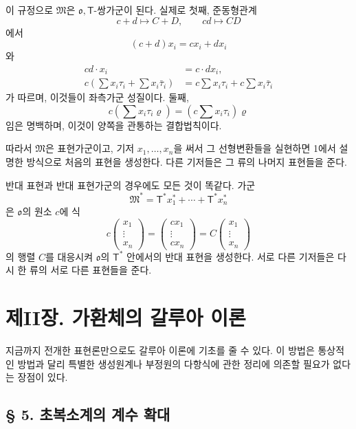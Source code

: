 이 규정으로 \(\mathfrak M\)은 \(\mathfrak{o},\mathsf T\)-쌍가군이 된다. 실제로 첫째, 준동형관계
\[
        c+d\longmapsto C+D,
        \qquad
        cd\longmapsto CD
\]
에서
\[
        (c+d)x_i=cx_i+dx_i
\]
와
\[
\begin{aligned}
cd\cdot x_i&=c\cdot dx_i,\\
c\left(\sum x_i\tau_i+\sum x_i\bar\tau_i\right)
&=c\sum x_i\tau_i+c\sum x_i\bar\tau_i
\end{aligned}
\]
가 따르며, 이것들이 좌측가군 성질이다. 둘째,
\[
        c\left(\sum x_i\tau_i\varrho\right)
        =\left(c\sum x_i\tau_i\right)\varrho
\]
임은 명백하며, 이것이 양쪽을 관통하는 결합법칙이다.

따라서 \(\mathfrak M\)은 표현가군이고, 기저 \(x_1,\ldots,x_n\)을 써서 그 선형변환들을 실현하면 1에서 설명한 방식으로 처음의 표현을 생성한다. 다른 기저들은 그 류의 나머지 표현들을 준다.

반대 표현과 반대 표현가군의 경우에도 모든 것이 똑같다. 가군
\[
        \mathfrak M^*
        =\mathsf T^*x_1^*+\cdots+\mathsf T^*x_n^*
\]
은 \(\mathfrak{o}\)의 원소 \(c\)에 식
\[
c\begin{pmatrix}x_1\\ \vdots\\ x_n\end{pmatrix}
=\begin{pmatrix}cx_1\\ \vdots\\ cx_n\end{pmatrix}
=C\begin{pmatrix}x_1\\ \vdots\\ x_n\end{pmatrix}
\]
의 행렬 \(C\)를 대응시켜 \(\mathfrak{o}\)의 \(\mathsf T^*\) 안에서의 반대 표현을 생성한다. 서로 다른 기저들은 다시 한 류의 서로 다른 표현들을 준다.

\section*{제II장. 가환체의 갈루아 이론}

지금까지 전개한 표현론만으로도 갈루아 이론에 기초를 줄 수 있다. 이 방법은 통상적인 방법과 달리 특별한 생성원계나 부정원의 다항식에 관한 정리에 의존할 필요가 없다는 장점이 있다.

\subsection*{§ 5. 초복소계의 계수 확대}


